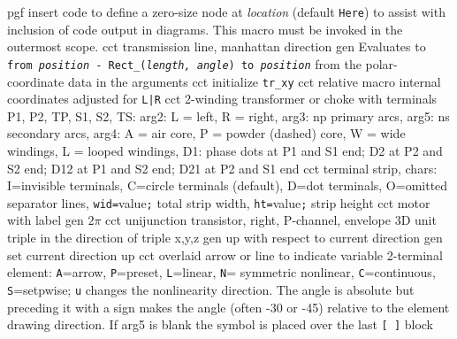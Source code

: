   {pgf}
  {insert \Tikz code to define a zero-size \Tikz node at {\sl location}
    (default {\tt Here}) to assist with inclusion of \pic code output
    in \Tikz diagrams.  This macro must be invoked in the outermost
    \pic scope.  }
  {cct}
  {transmission line, manhattan direction}
  {gen}
  {Evaluates to {\tt from {\sl position} - Rect\_({\sl length, angle}) to
   {\sl position}} from the polar-coordinate data in the arguments }
  {cct}
  {initialize {\tt tr\_xy}}
  {cct}
  {relative macro internal coordinates adjusted for {\tt L|R}}
  {cct}
  {2-winding transformer or choke with terminals P1, P2, TP, S1,
  S2, TS:
    arg2: L = left, R = right, arg3: np primary arcs, arg5: ns secondary
    arcs, arg4: A = air core, P = powder (dashed) core, W = wide windings,
    L = looped windings, D1: phase dots at P1 and S1 end; D2 at P2 and
    S2 end; D12 at P1 and S2 end; D21 at P2 and S1 end
   }
  {cct}
  {terminal strip, chars:
   I=invisible terminals, C=circle terminals (default), D=dot terminals,
   O=omitted separator lines, {\tt wid=}value{\tt ;} total strip width,
   {\tt ht=}value{\tt ;} strip height
    }
  {cct}
  {motor with label}
  {gen}
  {$2\pi$}
%
  {cct}
  {unijunction transistor, right, P-channel, envelope
    }
  {3D} {unit triple in the direction of triple x,y,z}
  {gen}
  {up with respect to current direction}
  {gen}
  {set current direction up }
%
  {cct}
  {overlaid arrow or line to indicate variable 2-terminal element:
    {\tt A}=arrow, {\tt P}=preset, {\tt L}=linear, {\tt N}= symmetric
    nonlinear, {\tt C}=continuous, {\tt S}=setpwise; {\tt u} changes
    the nonlinearity direction.  The angle is absolute but preceding
    it with a sign makes the angle (often -30 or -45) relative to the
    element drawing direction.  If arg5 is blank the symbol is placed
    over the last {\tt [ ]} block
   }
